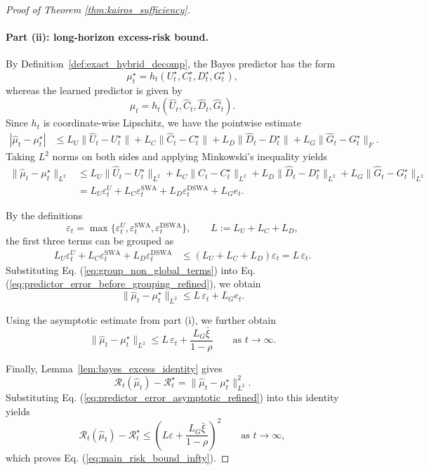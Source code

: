 \documentclass{llmxive}
\begin{document}
\begin{proof}[Proof of Theorem \ref{thm:kairos_sufficiency}]
\paragraph{Part \textup{(ii)}: long-horizon excess-risk bound.}
By Definition~\ref{def:exact_hybrid_decomp}, the Bayes predictor has the form
\[
\mu_t^\star = h_t(U_t^\star,C_t^\star,D_t^\star,G_t^\star),
\]
whereas the learned predictor is given by
\[
\hat\mu_t = h_t(\hat U_t,\hat C_t,\hat D_t,\hat G_t).
\]
Since $h_t$ is coordinate-wise Lipschitz, we have the pointwise estimate
\begin{align}
|\hat\mu_t-\mu_t^\star|
&\le
L_U\|\hat U_t-U_t^\star\|
+
L_C\|\hat C_t-C_t^\star\|
+
L_D\|\hat D_t-D_t^\star\|
+
L_G\|\hat G_t-G_t^\star\|_F.
\label{eq:pointwise_decoder_bound_refined}
\end{align}
Taking $L^2$ norms on both sides and applying Minkowski's inequality yields
\begin{align}
\|\hat\mu_t-\mu_t^\star\|_{L^2}
&\le
L_U\|\hat U_t-U_t^\star\|_{L^2}
+
L_C\|\hat C_t-C_t^\star\|_{L^2}
+
L_D\|\hat D_t-D_t^\star\|_{L^2}
+
L_G\|\hat G_t-G_t^\star\|_{L^2}
\nonumber\\
&=
L_U\varepsilon_t^U
+
L_C\varepsilon_t^{\mathrm{SWA}}
+
L_D\varepsilon_t^{\mathrm{DSWA}}
+
L_G e_t.
\label{eq:predictor_error_before_grouping_refined}
\end{align}

By the definitions
\[
\varepsilon_t
=
\max\!\bigl\{\varepsilon_t^U,\varepsilon_t^{\mathrm{SWA}},\varepsilon_t^{\mathrm{DSWA}}\bigr\},
\qquad
L:=L_U+L_C+L_D,
\]
the first three terms can be grouped as
\begin{align}
L_U\varepsilon_t^U
+
L_C\varepsilon_t^{\mathrm{SWA}}
+
L_D\varepsilon_t^{\mathrm{DSWA}}
&\le
(L_U+L_C+L_D)\varepsilon_t
=
L\,\varepsilon_t.
\label{eq:group_non_global_terms}
\end{align}
Substituting Eq. (\ref{eq:group_non_global_terms}) into Eq. (\ref{eq:predictor_error_before_grouping_refined}), we obtain
\begin{equation}
\|\hat\mu_t-\mu_t^\star\|_{L^2}
\le
L\,\varepsilon_t + L_G e_t.
\label{eq:predictor_error_grouped_refined}
\end{equation}

Using the asymptotic estimate from part \textup{(i)}, we further obtain
\begin{equation}
\|\hat\mu_t-\mu_t^\star\|_{L^2}
\le
L\,\varepsilon_t + \frac{L_G\bar\xi}{1-\rho}
\qquad \text{as } t\to\infty.
\label{eq:predictor_error_asymptotic_refined}
\end{equation}


Finally, Lemma~\ref{lem:bayes_excess_identity} gives
\[
\mathcal R_t(\hat\mu_t)-\mathcal R_t^\star
=
\|\hat\mu_t-\mu_t^\star\|_{L^2}^2.
\]
Substituting Eq. (\ref{eq:predictor_error_asymptotic_refined}) into this identity yields
\begin{equation}
\mathcal R_t(\hat\mu_t)-\mathcal R_t^\star
\le
\left(
L\varepsilon+\frac{L_G\bar\xi}{1-\rho}
\right)^2
\qquad \text{as } t\to\infty,
\label{eq:final_risk_bound_refined}
\end{equation}
which proves Eq. (\ref{eq:main_risk_bound_infty}).
\end{proof}
\end{document}
